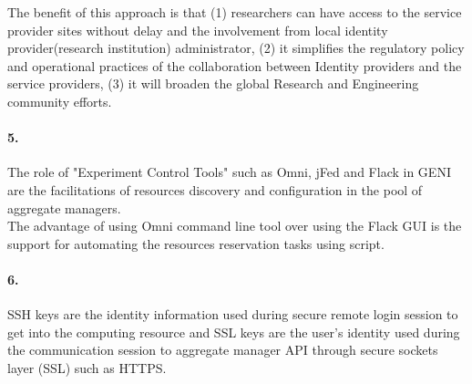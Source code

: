 \documentclass[a4paper]{article}
\begin{document}
The benefit of this approach is that (1) researchers can have access to the service provider sites without delay and the involvement from local identity provider(research institution) administrator, (2) it simplifies the regulatory policy and operational practices of the collaboration between Identity providers and the service providers, (3) it will broaden the global Research and Engineering community efforts.

\paragraph{5. } The role of "Experiment Control Tools" such as Omni, jFed and Flack in GENI are the facilitations of resources discovery and configuration in the pool of aggregate managers.\\

The advantage of using Omni command line tool over using the Flack GUI is the support for automating the resources reservation tasks using script.

\paragraph{6. } SSH keys are the identity information used during secure remote login session to get into the computing resource and SSL keys are the user's identity used during the communication session to aggregate manager API through secure sockets layer (SSL) such as HTTPS. 
\end{document}

